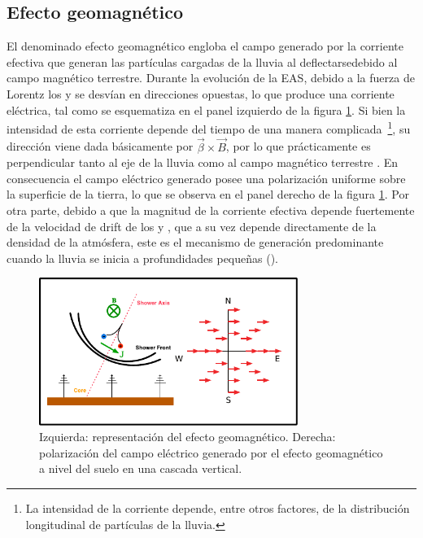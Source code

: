 \subsection{Efecto geomagn\'etico}
\label{sbsc:geom_emision}
	
	El denominado efecto geomagn\'etico engloba el campo generado por la corriente efectiva que generan las part\'iculas cargadas de la lluvia al deflectarsedebido al campo magn\'etico terrestre.
	Durante la evoluci\'on de la EAS, debido a la fuerza de Lorentz los \el{+} y \el{-} se desv\'ian en direcciones opuestas, lo que produce una corriente el\'ectrica, tal como se esquematiza en el panel izquierdo de la figura \ref{fig:geom_sketch}.
	Si bien la intensidad de esta corriente depende del tiempo de una manera complicada~\footnote{La intensidad de la corriente depende, entre otros factores, de la distribuci\'on longitudinal de part\'iculas de la lluvia.}, su direcci\'on viene dada b\'asicamente por $\vec\beta\times \vec B$, por lo que pr\'acticamente es perpendicular tanto al eje de la lluvia como al campo magn\'etico terrestre \cite{kahn:1966}.
	En consecuencia el campo el\'ectrico generado posee una polarizaci\'on uniforme sobre la superficie de la tierra, lo que se observa en el panel derecho de la figura \ref{fig:geom_sketch}.
	Por otra parte, debido a que la magnitud de la corriente efectiva depende fuertemente de la velocidad de drift de los \el{+} y \el{-}, que a su vez depende directamente de la densidad de la atm\'osfera, este es el mecanismo de generaci\'on predominante cuando la lluvia se inicia a profundidades peque\~nas ()\cite{requiered}.
	
	\begin{figure}[ht!]
		\centering
		\includegraphics[width=0.75\textwidth]{fig/EASRadio/geom_sketch}
		\caption{\label{fig:geom_sketch} Izquierda: representaci\'on del efecto geomagnético.
		Derecha: polarización del campo eléctrico generado por el efecto geomagnético a nivel del suelo en una cascada vertical.}
	\end{figure}
	
